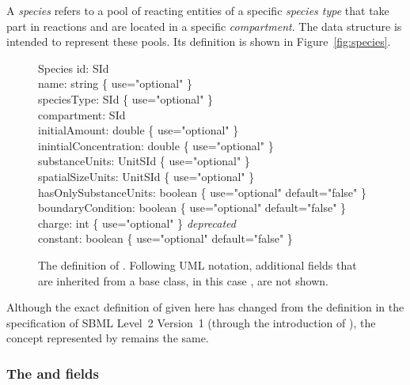 A \emph{species} refers to a pool of reacting entities
of a specific \emph{species type} that take part in
reactions and are located in a specific \emph{compartment}.
The \Species data
structure is intended to represent these pools.   Its definition
is shown in Figure~\vref{fig:species}.

\begin{figure}[htb]
  \centering
  \begin{classbox}{Species}
    id: SId                                                             \\
    name: string \{ use="optional" \}                                   \\
    speciesType: SId \{ use="optional" \}                 \\
    compartment: SId                                                    \\
    initialAmount: double \{ use="optional" \}                          \\
    inintialConcentration: double \{ use="optional" \}                  \\
    substanceUnits: UnitSId \{ use="optional" \}          \\
    spatialSizeUnits: UnitSId \{ use="optional" \}        \\
    hasOnlySubstanceUnits: boolean \{ use="optional" default="false" \} \\
    boundaryCondition: boolean \{ use="optional" default="false" \}     \\
    charge: int \{ use="optional" \} \emph{deprecated}    \\
    constant: boolean \{ use="optional" default="false" \}              \\
  \end{classbox}
  \caption{The definition of \Species.  Following UML notation,
    additional fields
    that are inherited from a base class, in this case \SBase, are not shown.}
  \label{fig:species}
\end{figure}

Although the exact definition of \Species given here has
changed from the definition in the specification of SBML Level~2
Version~1 (\ie through the introduction of \SpeciesType), the
concept represented by \Species remains the same.



\subsubsection{The  and  fields}

